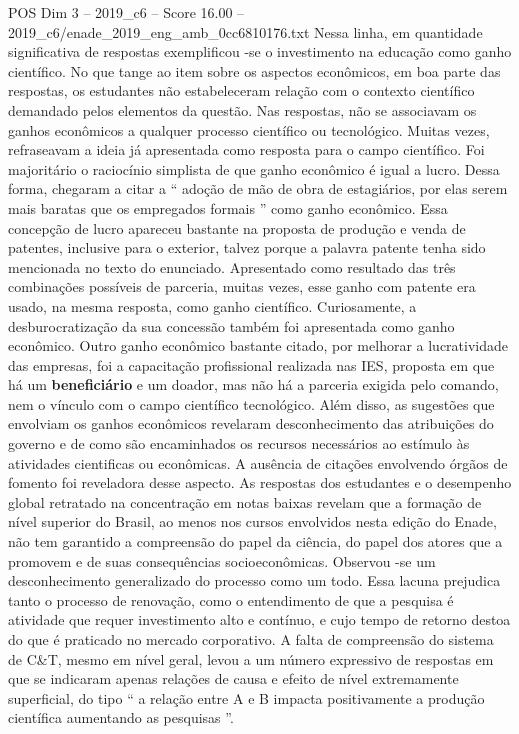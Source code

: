 \begin{textsample}{POS Dim 3 – 2019\_c6 – Score 16.00 – 2019\_c6/enade\_2019\_eng\_amb\_0cc6810176.txt}
Nessa linha, em quantidade significativa de respostas exemplificou -se o investimento na educação como ganho científico.
No que tange ao item sobre os aspectos econômicos, em boa parte das respostas, os estudantes não estabeleceram relação com o contexto científico demandado pelos elementos da questão.
Nas respostas, não se associavam os ganhos econômicos a qualquer processo científico ou tecnológico.
Muitas vezes, refraseavam a ideia já apresentada como resposta para o campo científico.
Foi majoritário o raciocínio simplista de que ganho econômico é igual a lucro.
Dessa forma, chegaram a citar a “ adoção de mão de obra de estagiários, por elas serem mais baratas que os empregados formais ” como ganho econômico.
Essa concepção de lucro apareceu bastante na proposta de produção e venda de patentes, inclusive para o exterior, talvez porque a palavra patente tenha sido mencionada no texto do enunciado.
Apresentado como resultado das três combinações possíveis de parceria, muitas vezes, esse ganho com patente era usado, na mesma resposta, como ganho científico.
Curiosamente, a desburocratização da sua concessão também foi apresentada como ganho econômico.
Outro ganho econômico bastante citado, por melhorar a lucratividade das empresas, foi a capacitação profissional realizada nas IES, proposta em que há um \textbf{beneficiário} e um doador, mas não há a parceria exigida pelo comando, nem o vínculo com o campo científico tecnológico.
Além disso, as sugestões que envolviam os ganhos econômicos revelaram desconhecimento das atribuições do governo e de como são encaminhados os recursos necessários ao estímulo às atividades cientificas ou econômicas.
A ausência de citações envolvendo órgãos de fomento foi reveladora desse aspecto.
As respostas dos estudantes e o desempenho global retratado na concentração em notas baixas revelam que a formação de nível superior do Brasil, ao menos nos cursos envolvidos nesta edição do Enade, não tem garantido a compreensão do papel da ciência, do papel dos atores que a promovem e de suas consequências socioeconômicas.
Observou -se um desconhecimento generalizado do processo como um todo.
Essa lacuna prejudica tanto o processo de renovação, como o entendimento de que a pesquisa é atividade que requer investimento alto e contínuo, e cujo tempo de retorno destoa do que é praticado no mercado corporativo.
A falta de compreensão do sistema de C\&T, mesmo em nível geral, levou a um número expressivo de respostas em que se indicaram apenas relações de causa e efeito de nível extremamente superficial, do tipo “ a relação entre A e B impacta positivamente a produção científica aumentando as pesquisas ”.

\end{textsample}
